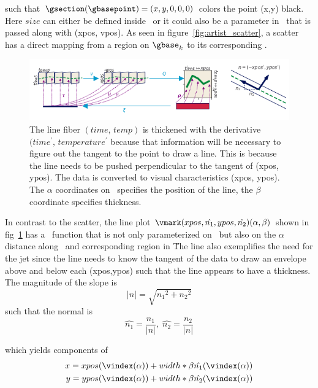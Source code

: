 \documentclass[../main.tex]{subfiles}
\begin{document}
such that $\gsection(\gbasepoint) = (x, y, 0, 0, 0)$ colors the point (x,y) black. Here $size$ can either be defined inside \vmark\ or it could also be a parameter in \vtotal\ that is passed along with (xpos, vpos). As seen in figure~\ref{fig:artist_scatter}, a scatter has a direct mapping from a region on $\gbase_{k}$ to its corresponding \dbasepoint. 


\begin{figure}[H]
    \includegraphics[width=\textwidth]{figures/math/line_with_s.png}
    \caption{The line fiber $(time,\, temp)$ is thickened with the derivative $(time^{\prime},\, temperature^{\prime}$ because that information will be necessary to figure out the tangent to the point to draw a line. This is because the line needs to be pushed perpendicular to the tangent of (xpos, ypos). The data is converted to visual characteristics (xpos, ypos). The $\alpha$ coordinates on \gbase\ specifies the position of the line, the $\beta$ coordinate specifies thickness.}
    \label{fig:artist_line}
\end{figure}

In contrast to the scatter, the line plot $\vmark(xpos, \hat{n_{1}}, ypos, \hat{n_{2}})(\alpha, \beta)$ shown in fig~\ref{fig:artist_line} has a \vindex\ function that is not only parameterized on \dbasepoint\ but also on the $\alpha$ distance along \dbasepoint\ and corresponding region in \gbase\. The line also exemplifies the need for the jet since the line needs to know the tangent of the data to draw an envelope above and below each (xpos,ypos) such that the line appears to have a thickness. The magnitude of the slope is 
\begin{equation}
    \lvert n \rvert = \sqrt{{n_{1}}^2 + {n_{2}}^2}
\end{equation}
such that the normal is  
\begin{equation}
    \hat{n_{1}} = \frac{n_1}{\lvert n \rvert}, \; \hat{n_{2}} = \frac{n_2}{\lvert n \rvert}
\end{equation}

which yields components of \gsection\
\begin{align}
 x = xpos(\vindex(\alpha)) &+ width*\beta\hat{n_1}(\vindex(\alpha)) \\
 y = ypos(\vindex(\alpha)) &+ width*\beta\hat{n_2}(\vindex(\alpha)) 
\end{align}
\end{document}
